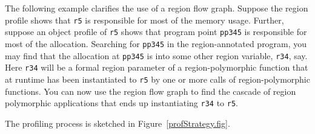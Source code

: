 \documentclass[12pt]{book}
\begin{document}
The following example clarifies the use of a region flow graph.
Suppose the region profile shows that \texttt{r5} is responsible for
most of the memory usage.  Further, suppose an object profile of
\texttt{r5} shows that program point \texttt{pp345} is responsible for
most of the allocation.  Searching for \texttt{pp345} in the
region-annotated program, you may find that the allocation at
\texttt{pp345} is into some other region variable, \texttt{r34}, say.
Here \texttt{r34} will be a formal region parameter of a
region-polymorphic function that at runtime has been instantiated to
\texttt{r5} by one or more calls of region-polymorphic functions.
You can now use the region flow graph to find the cascade of region
polymorphic applications that ends up instantiating \texttt{r34} to
\texttt{r5}.

The profiling process is sketched in Figure~\ref{profStrategy.fig}.
\setlength{\unitlength}{6mm}
\newcommand{\picbox}[1]{\framebox(7,4){\parbox{38mm}{\begin{center}
        #1 \end{center}}}}
\end{document}
